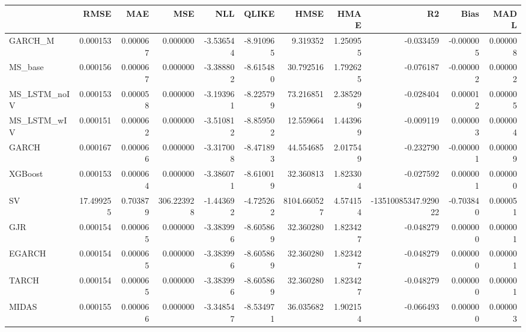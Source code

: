 \begin{tabular}{lrrrrrrrrrr}
\toprule
 & RMSE & MAE & MSE & NLL & QLIKE & HMSE & HMAE & R2 & Bias & MADL \\
\midrule
GARCH_M & 0.000153 & 0.000067 & 0.000000 & -3.536544 & -8.910965 & 9.319352 & 1.250955 & -0.033459 & -0.000005 & 0.000008 \\
MS_base & 0.000156 & 0.000067 & 0.000000 & -3.388802 & -8.615480 & 30.792516 & 1.792625 & -0.076187 & -0.000002 & 0.000002 \\
MS_LSTM_noIV & 0.000153 & 0.000058 & 0.000000 & -3.193961 & -8.225799 & 73.216851 & 2.385299 & -0.028404 & 0.000012 & 0.000005 \\
MS_LSTM_wIV & 0.000151 & 0.000062 & 0.000000 & -3.510812 & -8.859502 & 12.559664 & 1.443969 & -0.009119 & 0.000003 & 0.000004 \\
GARCH & 0.000167 & 0.000066 & 0.000000 & -3.317008 & -8.471893 & 44.554685 & 2.017549 & -0.232790 & -0.000001 & 0.000009 \\
XGBoost & 0.000153 & 0.000064 & 0.000000 & -3.386071 & -8.610019 & 32.360813 & 1.823304 & -0.027592 & 0.000001 & 0.000000 \\
SV & 17.499255 & 0.703879 & 306.223928 & -1.443692 & -4.725262 & 8104.660527 & 4.574154 & -13510085347.929022 & -0.703840 & 0.000051 \\
GJR & 0.000154 & 0.000065 & 0.000000 & -3.383996 & -8.605869 & 32.360280 & 1.823427 & -0.048279 & 0.000000 & 0.000001 \\
EGARCH & 0.000154 & 0.000065 & 0.000000 & -3.383996 & -8.605869 & 32.360280 & 1.823427 & -0.048279 & 0.000000 & 0.000001 \\
TARCH & 0.000154 & 0.000065 & 0.000000 & -3.383996 & -8.605869 & 32.360280 & 1.823427 & -0.048279 & 0.000000 & 0.000001 \\
MIDAS & 0.000155 & 0.000066 & 0.000000 & -3.348547 & -8.534971 & 36.035682 & 1.902154 & -0.066493 & 0.000000 & 0.000003 \\
\bottomrule
\end{tabular}
